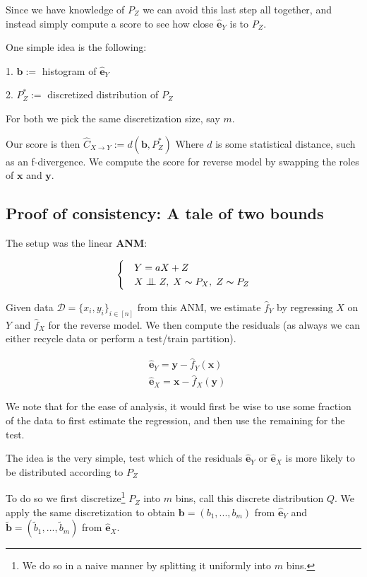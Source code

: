  Since we have knowledge of $P_Z$ we can avoid this last step all together, and instead simply 
 compute a score to see how close $\mathbf{\hat{e}}_Y$ is to $P_Z$. 

 One simple idea is the following:

 1. $\mathbf{b} :=$ histogram of $\mathbf{\hat{e}}_Y$

 2. $P^*_Z :=$  discretized distribution of $P_Z$

 For both we pick the same discretization size, say $m$. 

 Our score is then 
 $
     \hat{C}_{X \rightarrow Y} := d\left(\mathbf{b}, P^*_Z \right)
 $
 Where $d$ is some statistical distance, such as an f-divergence. We compute the score for reverse model 
 by swapping the roles of $\mathbf{x}$ and $\mathbf{y}$.


\subsection{Proof of consistency: A tale of two bounds}

The setup was the linear \textbf{ANM}:

\[ \begin{cases} 
    & Y = aX + Z  \\
    & X \bigCI Z,\; X \thicksim P_X,\; Z \thicksim P_{Z}  
 \end{cases}
\]

Given data $\mathcal{D} = \{x_i, y_i\}_{i \in [n]}$ from this ANM, we 
estimate $\hat{f}_Y$ by regressing $X$ on $Y$ and 
$\hat{f}_X$ for the reverse model. We then compute the residuals (as always we can 
either recycle data or perform a test/train partition). 

\begin{align}
    &  \hat{\mathbf{e}}_Y = \mathbf{y} - \hat{f}_Y(\mathbf{x})\\
    &  \hat{\mathbf{e}}_X = \mathbf{x} - \hat{f}_X(\mathbf{y})
\end{align}

We note that for the ease of analysis, it would first be wise to use some fraction 
of the data to first estimate the regression, and then use the remaining for the test.

The idea is the very simple, test which of the residuals $\hat{\mathbf{e}}_Y$ or 
$\hat{\mathbf{e}}_X$ is more likely to be distributed according to $P_Z$

To do so we first discretize\footnote{We do so in a naive manner by splitting
it uniformly into $m$ bins.} $P_{Z}$ into $m$ bins, call this discrete distribution
$Q$. We apply the same discretization to obtain $\mathbf{b} = (b_1, ..., b_m)$ from $\hat{\mathbf{e}}_Y$
and $\tilde{\mathbf{b}} = (\tilde{b}_1, ..., \tilde{b}_m)$ from $\hat{\mathbf{e}}_X$.

